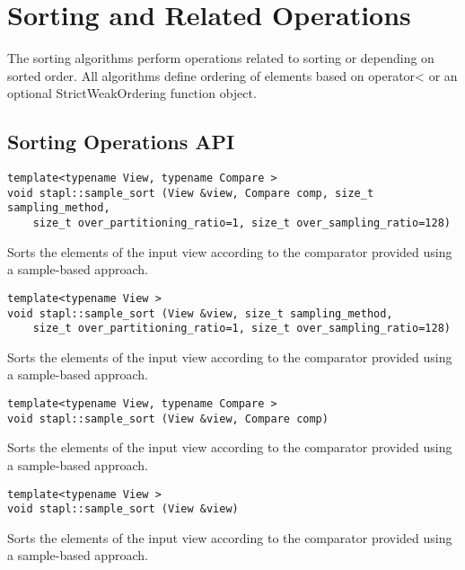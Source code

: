 
\pagebreak

\section{Sorting and Related Operations} \label{sec-sorting-alg}

The sorting algorithms perform operations related to sorting or depending on sorted order. All algorithms define ordering of elements based on operator< or an optional StrictWeakOrdering function object.

\subsection{Sorting Operations API} \label{sec-sort-alg}

\begin{verbatim}
template<typename View, typename Compare >
void stapl::sample_sort (View &view, Compare comp, size_t sampling_method,
    size_t over_partitioning_ratio=1, size_t over_sampling_ratio=128)
\end{verbatim}

Sorts the elements of the input view according to the comparator provided using a sample-based approach.

\begin{verbatim}
template<typename View >
void stapl::sample_sort (View &view, size_t sampling_method,
    size_t over_partitioning_ratio=1, size_t over_sampling_ratio=128)
\end{verbatim}

Sorts the elements of the input view according to the comparator provided using a sample-based approach.

\begin{verbatim}
template<typename View, typename Compare >
void stapl::sample_sort (View &view, Compare comp)
\end{verbatim}

Sorts the elements of the input view according to the comparator provided using a sample-based approach.

\begin{verbatim}
template<typename View >
void stapl::sample_sort (View &view)
\end{verbatim}

Sorts the elements of the input view according to the comparator provided using a sample-based approach.

